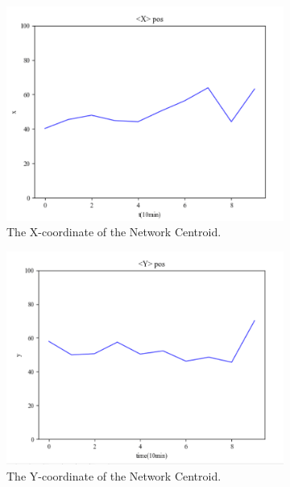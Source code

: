 \documentclass{mcmthesis}
\begin{document}
	\begin{figure}[h]
		\centering
		\begin{subfigure}[b]{0.5\textwidth}
			\includegraphics[width=\textwidth]{figures/xc1.png}
			\caption{The X-coordinate of the Network Centroid.}
			\label{fig:x1}
		\end{subfigure}%
		\begin{subfigure}[b]{0.5\textwidth}
			\includegraphics[width=\textwidth]{figures/yc1.png}
			\caption{The Y-coordinate of the Network Centroid.}
			\label{fig:y1}
		\end{subfigure}
		\begin{subfigure}[b]{0.5\textwidth}

\end{subfigure}
\end{figure}
\end{document}
